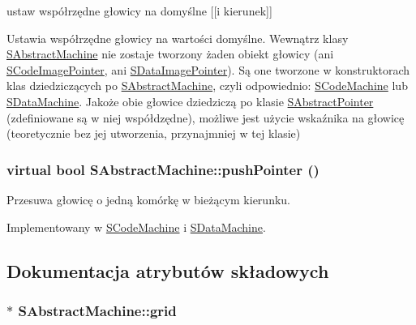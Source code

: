 ustaw współrzędne głowicy na domyślne \mbox{[}\mbox{[}i kierunek\mbox{]}\mbox{]} 

Ustawia współrzędne głowicy na wartości domyślne. Wewnątrz klasy \hyperlink{classSAbstractMachine}{SAbstractMachine} nie zostaje tworzony żaden obiekt głowicy (ani \hyperlink{classSCodeImagePointer}{SCodeImagePointer}, ani \hyperlink{classSDataImagePointer}{SDataImagePointer}). Są one tworzone w konstruktorach klas dziedziczących po \hyperlink{classSAbstractMachine}{SAbstractMachine}, czyli odpowiednio: \hyperlink{classSCodeMachine}{SCodeMachine} lub \hyperlink{classSDataMachine}{SDataMachine}. Jakoże obie głowice dziedziczą po klasie \hyperlink{classSAbstractPointer}{SAbstractPointer} (zdefiniowane są w niej współdzędne), możliwe jest użycie wskaźnika na głowicę (teoretycznie bez jej utworzenia, przynajmniej w tej klasie) \hypertarget{classSAbstractMachine_72a47b72416e0d2f24fcf36415d37404}{
\subsubsection[{pushPointer}]{\setlength{\rightskip}{0pt plus 5cm}virtual bool SAbstractMachine::pushPointer ()}}
\label{classSAbstractMachine_72a47b72416e0d2f24fcf36415d37404}


Przesuwa głowicę o jedną komórkę w bieżącym kierunku. 

Implementowany w \hyperlink{classSCodeMachine_69a97f71f2a16f69f9daca1bf8433964}{SCodeMachine} i \hyperlink{classSDataMachine_10eb8f56cf6235455a26c5c673b8fe15}{SDataMachine}.

\subsection{Dokumentacja atrybutów składowych}
\hypertarget{classSAbstractMachine_08b7046c29a7a5f248f324edee91f2dc}{
\subsubsection[{grid}]{$\ast$ {\bf SAbstractMachine::grid}}}
\label{classSAbstractMachine_08b7046c29a7a5f248f324edee91f2dc}


